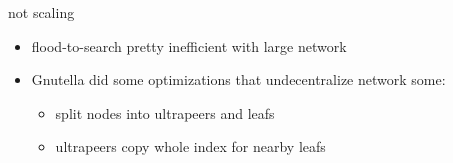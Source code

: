 \begin{frame}{not scaling}
    \begin{itemize}
    \item flood-to-search pretty inefficient with large network
    \vspace{.5cm}
    \item Gnutella did some optimizations that undecentralize network some:
        \begin{itemize}
        \item split nodes into ultrapeers and leafs
        \item ultrapeers copy whole index for nearby leafs
        \end{itemize}
    \end{itemize}
\end{frame}
